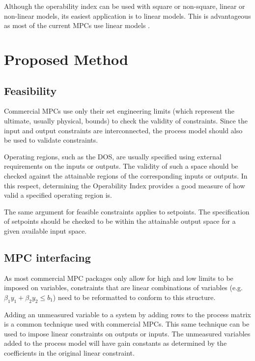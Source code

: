 \documentclass[final,authoryear,5pt,times,twocolumn]{elsarticle}
\begin{document}
Although the operability index can be used with square or non-square, linear or non-linear models, its easiest application is to linear models. 
This is advantageous as most of the current MPCs use linear models \citep{vinsonphd}.


\section{Proposed Method}\label{sec:method}

\subsection{Feasibility}\label{sec:feasibility}
Commercial MPCs use only their set engineering limits (which represent the ultimate, usually physical, bounds) to check the validity of constraints.
Since the input and output constraints are interconnected, the process model should also be used to validate constraints.

Operating regions, such as the DOS, are usually specified using external requirements on the inputs or outputs.
The validity of such a space should be checked against the attainable regions of the corresponding inputs or outputs.
In this respect, determining the Operability Index provides a good measure of how valid a specified operating region is.

The same argument for feasible constraints applies to setpoints.
The specification of setpoints should be checked to be within the attainable output space for a given available input space.

\subsection{MPC interfacing}\label{sec:lincons}
As most commercial MPC packages only allow for high and low limits to be imposed on variables, constraints that are linear combinations of variables (e.g. $\beta_1 y_1+\beta_2 y_2\leq b_1$) need to be reformatted to conform to this structure.

Adding an unmeasured variable to a system by adding rows to the process matrix is a common technique used with commercial MPCs.
This same technique can be used to impose linear constraints on outputs or inputs.
The unmeasured variables added to the process model will have gain constants as determined by the coefficients in the original linear constraint.
\end{document}
